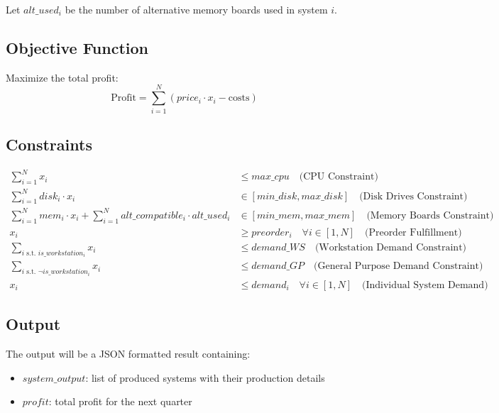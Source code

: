 \documentclass{article}
\begin{document}
Let \( alt\_used_i \) be the number of alternative memory boards used in system \( i \).

\subsection*{Objective Function}
Maximize the total profit:
\[
\text{Profit} = \sum_{i=1}^N \left( price_i \cdot x_i - \text{costs} \right)
\]

\subsection*{Constraints}
\begin{align*}
\sum_{i=1}^N x_i & \leq max\_cpu \quad \text{(CPU Constraint)} \\
\sum_{i=1}^N disk_i \cdot x_i & \in [min\_disk, max\_disk] \quad \text{(Disk Drives Constraint)} \\
\sum_{i=1}^N mem_i \cdot x_i + \sum_{i=1}^N alt\_compatible_i \cdot alt\_used_i & \in [min\_mem, max\_mem] \quad \text{(Memory Boards Constraint)} \\
x_i & \geq preorder_i \quad \forall i \in [1, N] \quad \text{(Preorder Fulfillment)} \\
\sum_{i \text{ s.t. } is\_workstation_i} x_i & \leq demand\_WS \quad \text{(Workstation Demand Constraint)} \\
\sum_{i \text{ s.t. } \neg is\_workstation_i} x_i & \leq demand\_GP \quad \text{(General Purpose Demand Constraint)} \\
x_i & \leq demand_i \quad \forall i \in [1, N] \quad \text{(Individual System Demand)}
\end{align*}

\subsection*{Output}
The output will be a JSON formatted result containing:
\begin{itemize}
    \item \( system\_output \): list of produced systems with their production details
    \item \( profit \): total profit for the next quarter
\end{itemize}
\end{document}
